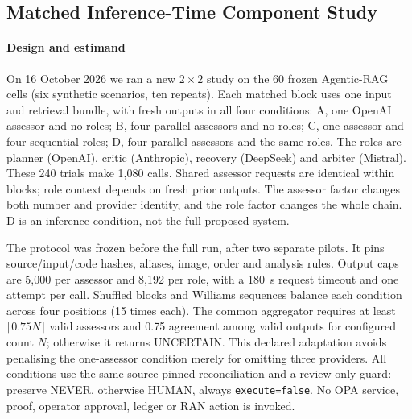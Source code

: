 \begin{revision}
\subsection{Matched Inference-Time Component Study}
\label{sec:matched-inference}
\paragraph{Design and estimand}
On 16 October 2026 we ran a new $2\times2$ study on the 60 frozen
Agentic-RAG cells (six synthetic scenarios, ten repeats). Each matched block
uses one input and retrieval bundle, with fresh outputs in all four
conditions: A, one OpenAI assessor and no roles; B, four parallel assessors
and no roles; C, one assessor and four sequential roles; D, four parallel
assessors and the same roles. The roles are planner (OpenAI), critic
(Anthropic), recovery (DeepSeek) and arbiter (Mistral). These 240 trials make
1,080 calls. Shared assessor requests are identical within blocks; role
context depends on fresh prior outputs. The assessor factor changes both
number and provider identity, and the role factor changes the whole chain.
D is an inference condition, not the full proposed system.

The protocol was frozen before the full run, after two separate pilots.
It pins source/input/code hashes, aliases, image, order and analysis rules.
Output caps are 5,000 per assessor and 8,192 per role, with a 180~s request
timeout and one attempt per call. Shuffled blocks and Williams sequences
balance each condition across four positions (15 times each). The common
aggregator requires at least $\lceil0.75N\rceil$ valid assessors and 0.75
agreement among valid outputs for configured count $N$; otherwise it returns
UNCERTAIN. This declared adaptation avoids penalising the one-assessor
condition merely for omitting three providers. All conditions use the same
source-pinned reconciliation and a review-only guard: preserve NEVER,
otherwise HUMAN, always \texttt{execute=false}. No OPA service, proof,
operator approval, ledger or RAN action is invoked.


\end{revision}
